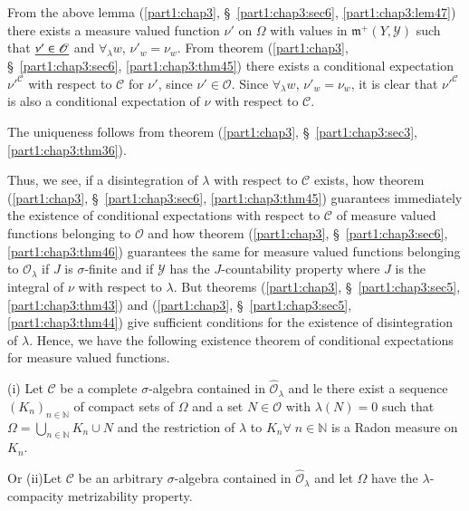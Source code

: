 \medskip
{}
From the above lemma (\ref{part1:chap3}, \S\ \ref{part1:chap3:sec6},
\ref{part1:chap3:lem47}) there exists a measure valued 
function $\nu'$ on $\Omega$ with values in $\mathfrak{m}^+(Y,
\mathscr{Y})$ such that $\underline{\nu' \in \mathscr{O}}$ and
$\forall_\lambda w$, $\nu'_w = \nu_w$. From theorem
(\ref{part1:chap3}, \S\ \ref{part1:chap3:sec6},
\ref{part1:chap3:thm45}) 
there exists a conditional expectation ${\nu'}^\mathscr{C}$ with
respect to $\mathscr{C}$ for $\nu'$, since $\nu'\in
\mathscr{O}$. Since $\forall_\lambda w$, $\nu'_w = \nu_w$, it is clear
that ${\nu'}^\mathscr{C}$ is also a conditional expectation of $\nu$
with respect to $\mathscr{C}$. 


The uniqueness follows from theorem (\ref{part1:chap3},
\S\ \ref{part1:chap3:sec3}, \ref{part1:chap3:thm36}).  

Thus, we see, if a disintegration of $\lambda$ with respect to
$\mathscr{C}$ exists, how theorem (\ref{part1:chap3},
\S\ \ref{part1:chap3:sec6}, \ref{part1:chap3:thm45}) guarantees 
immediately the existence of conditional expectations with respect to
$\mathscr{C}$ of measure valued functions belonging to $\mathscr{O}$
and how theorem (\ref{part1:chap3}, \S\ \ref{part1:chap3:sec6},
\ref{part1:chap3:thm46}) guarantees the same for measure 
valued functions belonging to $\hat{\mathscr{O}}_\lambda$ if $J$ is
$\sigma$-finite and if $\mathscr{Y}$ has the $J$-countability property
where $J$ is the integral of $\nu$ with respect to $\lambda$. But
theorems (\ref{part1:chap3}, \S\ \ref{part1:chap3:sec5},
\ref{part1:chap3:thm43}) and (\ref{part1:chap3},
\S\ \ref{part1:chap3:sec5}, \ref{part1:chap3:thm44}) give sufficient  
conditions for the existence of disintegration of $\lambda$. Hence, we
have the following existence theorem of conditional expectations for
measure valued functions. 

\begin{thm}\label{part1:chap3:thm48}
(i) Let $\mathscr{C}$ be a complete $\sigma$-algebra contained in
  $\hat{\mathscr{O}}_\lambda$ and le there exist a sequence $(K_n)_{n
    \in \mathbb{N}}$ of compact sets of $\Omega$ and a set $N
  \in\mathscr{O}$ with $\lambda(N) =0$ such that $\Omega =
  \bigcup\limits_{n \in \mathbb{N}} K_n \cup N$ and the restriction of
  $\lambda$ to $K_n \forall \; n \in \mathbb{N}$ is a Radon measure on
  $K_n$.

Or (ii)\pageoriginale Let $\mathscr{C}$ be an arbitrary
$\sigma$-algebra contained in $\hat{\mathscr{O}}_\lambda$ and let
$\Omega$ have the $\lambda$-compacity metrizability property. 
 \end{thm}

